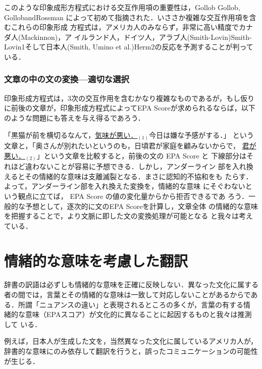 \documentclass[japanese]{jnlp_1.3d}
\newcommand{\citep}{}
\begin{document}
このような印象成形方程式における交互作用項の重要性は，Gollob
\citep{Gollob}, \citep{GollobandRossman}
によって初めて指摘された．いささか複雑な交互作用項を含むこれらの印象形成
方程式は，アメリカ人のみならず，非常に高い精度でカナダ人(Mackinnon)，ア
イルランド人，ドイツ人，アラブ人(Smith-Lovin)\citep{Smith-Lovin1}そして日本人(Smith, Umino et al.)\citep{Herm2}の反応を予測することが判っている．




    \subsubsection*{文章の中の文の変換—適切な選択}
印象形成方程式は，3次の交互作用を含むかなり複雑なものであるが，もし仮り
に前後の文章が，印象形成方程式によってEPA Scoreが求められるならば，以下
のような問題にも答えを与え得るであろう．


「黒猫が前を横切るなんて，\underline{気味が悪い．}$_{(1)}$今日は嫌な予感がする．」
という文章と，「奥さんが別れたいというのも，日頃君が家庭を顧みないからで，
\underline{君が悪い．}$_{(2)}$」という文章を比較すると，前後の文の EPA Score と
下線部分はそれほど違わないことが容易に予想できる．しかし，アンダーライン
部を入れ換えるとその情緒的な意味は支離滅裂となる．まさに認知的不協和をも
たらす．よって，アンダーライン部を入れ換えた変換を，情緒的な意味
にそぐわないという観点に立てば， EPA Score の値の変化量からから拒否できるであ
ろう．一般的な予想として，逐次的に文のEPA Scoreを計算し，文章全体
の情緒的な意味を把握することで，より文脈に即した文の変換処理が可能となる
と我々は考えている．




\section{情緒的な意味を考慮した翻訳}
辞書の訳語は必ずしも情緒的な意味を正確に反映しない．異なった文化に属する
者の間では，言葉とその情緒的な意味は一致して対応しないことがあるからであ
る．所謂「ニュアンスの違い」と表現されるところの多くが，言葉の有する情
緒的な意味（EPAスコア）が文化的に異なることに起因するものと我々は推測して
いる．

例えば，日本人が生成した文を，当然異なった文化に属しているアメリカ人が，
辞書的な意味にのみ依存して翻訳を行うと，誤ったコミュニケーションの可能性
が生じる．
\end{document}
